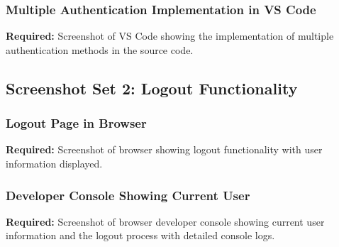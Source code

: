 \documentclass[11pt,a4paper]{article}
\begin{document}
\subsubsection{Multiple Authentication Implementation in VS Code}


\textbf{Required:} Screenshot of VS Code showing the implementation of multiple authentication methods in the source code.

\subsection{Screenshot Set 2: Logout Functionality}

\subsubsection{Logout Page in Browser}


\textbf{Required:} Screenshot of browser showing logout functionality with user information displayed.

\subsubsection{Developer Console Showing Current User}


\textbf{Required:} Screenshot of browser developer console showing current user information and the logout process with detailed console logs.
\end{document}
